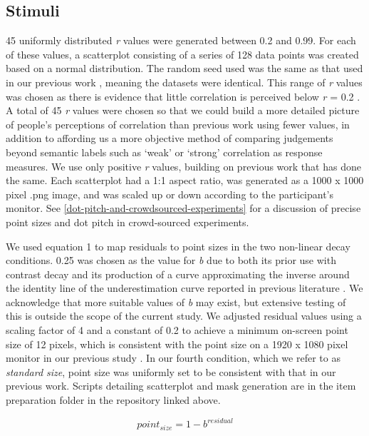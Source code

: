 \documentclass{vgtc}                          %
\begin{document}
\hypertarget{stimuli}{%
\subsection{Stimuli}\label{stimuli}}

45 uniformly distributed \emph{r} values were generated between 0.2 and 0.99.
For each of these values, a scatterplot consisting of a series of 128 data points
was created based on a normal distribution. The random seed used was the same
as that used in our previous work \cite{strain_2023}, meaning the datasets were
identical. This range of \emph{r} values was chosen as there is evidence
that little correlation is perceived below \emph{r} = 0.2 \cite{strahan_1978, bobko_1979, cleveland_1982}.
A total of 45 \emph{r} values were chosen so that we could build a more detailed picture
of people's perceptions of correlation than previous work using fewer values,
in addition to affording us a more objective method of comparing judgements
beyond semantic labels such as `weak' or `strong' correlation as response measures.
We use only positive \emph{r} values, building on previous work that has done the same.
Each scatterplot had a 1:1 aspect ratio, was generated as a 1000 x 1000 pixel .png image, and was
scaled up or down according to the participant's monitor. See
\autoref{dot-pitch-and-crowdsourced-experiments} for a discussion of
precise point sizes and dot pitch in crowd-sourced experiments.

We used equation 1 to map residuals
to point sizes in the two non-linear decay conditions. 0.25 was chosen as the
value for \emph{b} due to both its prior use with contrast decay \cite{strain_2023} and its
production of a curve approximating the inverse around the identity line of the
underestimation curve reported in previous literature \cite{rensink_2017}.
We acknowledge that more suitable values of \emph{b} may exist, but extensive
testing of this is outside the scope of the current study.
We adjusted residual values using a scaling factor of 4 and a
constant of 0.2 to achieve a minimum on-screen point size of 12 pixels, which
is consistent with the point size on a 1920 x 1080 pixel monitor in our previous study
\cite{strain_2023}. In our fourth condition,
which we refer to as \emph{standard size}, point size was uniformly
set to be consistent with that in our previous
work. Scripts detailing scatterplot and mask generation are in the item
preparation folder in the repository linked above.

\begin{equation}
  point_{size} = 1 - b^{residual}
\end{equation}
\end{document}
